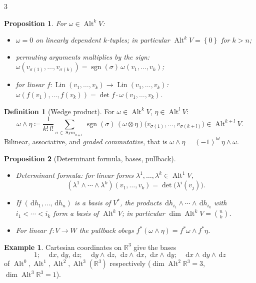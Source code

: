 \documentclass[10pt,a4paper,landscape]{article}
\theoremstyle{definition}
\newtheorem{defn}{Definition}[section]
\newtheorem{exm}{Example}[section]
\theoremstyle{plain}
\newtheorem{prop}{Proposition}[section]
\theoremstyle{remark}
\newcommand{\R}{\mathbb{R}}
\newcommand{\dd}{\,\mathrm{d}}
\newcommand{\set}[1]{\left\{ #1 \right\}}
\newcommand{\deq}{\coloneqq}
\DeclareMathOperator{\Alt}{Alt}
\DeclareMathOperator{\Sym}{Sym}
\DeclareMathOperator{\sgn}{sgn}
\DeclareMathOperator{\Lin}{Lin}
\begin{document}
\begin{multicols*}{3}
\begin{prop}
For $\omega \in \Alt^k V$:
\begin{itemize}
\item $\omega = 0$ on linearly dependent $k$-tuples; in particular $\Alt^k V = \set{0}$ for $k > n$;
\item permuting arguments multiplies by the sign: $\omega(v_{\sigma(1)}, \dots, v_{\sigma(k)}) = \sgn(\sigma)\, \omega(v_1, \dots, v_k)$;
\item for linear $f: \Lin(v_1, \dots, v_k) \to \Lin(v_1, \dots, v_k)$: $\omega(f(v_1), \dots, f(v_k)) = \det f \cdot \omega(v_1, \dots, v_k)$.
\end{itemize}
\end{prop}

\begin{defn}[Wedge product]
For $\omega \in \Alt^k V$, $\eta \in \Alt^l V$:
{\footnotesize\[
\omega \wedge \eta \deq \frac{1}{k!\,l!} \sum_{\sigma \in \Sym_{k+l}} \sgn(\sigma)\, (\omega \otimes \eta)\bigl(v_{\sigma(1)}, \dots, v_{\sigma(k+l)}\bigr) \in \Alt^{k+l} V .
\]}
Bilinear, associative, and \emph{graded commutative}, that is $\omega \wedge \eta = (-1)^{kl}\, \eta \wedge \omega$.
\end{defn}

\begin{prop}[Determinant formula, bases, pullback]
\begin{itemize}
\item Determinant formula: for linear forms $\lambda^1, \dots, \lambda^k \in \Alt^1 V$,
\[
(\lambda^1 \wedge \cdots \wedge \lambda^k)(v_1, \dots, v_k) = \det\bigl(\lambda^i(v_j)\bigr).
\]
\item If $(\dd h_1, \dots, \dd h_n)$ is a basis of $V^*$, the products $\dd h_{i_1} \wedge \cdots \wedge \dd h_{i_k}$ with $i_1 < \cdots < i_k$ form a basis of $\Alt^k V$; in particular $\dim \Alt^k V = \binom{n}{k}$.
\item For linear $f: V \to W$ the pullback obeys $f^*(\omega \wedge \eta) = f^*\omega \wedge f^*\eta$.
\end{itemize}
\end{prop}

\begin{exm}
Cartesian coordinates on $\R^3$ give the bases
{\footnotesize\[
1; \quad \dd x, \dd y, \dd z; \quad \dd y \wedge \dd z,\ \dd z \wedge \dd x,\ \dd x \wedge \dd y; \quad \dd x \wedge \dd y \wedge \dd z
\]}
of $\Alt^0, \Alt^1, \Alt^2, \Alt^3(\R^3)$ respectively ($\dim \Alt^2 \R^3 = 3$, $\dim \Alt^3 \R^3 = 1$).
\end{exm}


\end{multicols*}
\end{document}
